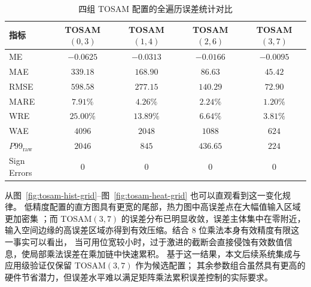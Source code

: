 \documentclass[12pt,a4paper,UTF8]{article}
\begin{document}
\begin{table}[htbp]
    \centering
    \caption{四组 TOSAM 配置的全遍历误差统计对比}
    \label{tab:tosam-error-compare}
    \small
    \setlength{\tabcolsep}{5pt}
    \begin{tabular}{lcccc}
        \toprule
        指标 & TOSAM$(0,3)$ & TOSAM$(1,4)$ & TOSAM$(2,6)$ & TOSAM$(3,7)$ \\
        \midrule
        ME & $-0.0625$ & $-0.0313$ & $-0.0166$ & $-0.0095$ \\
        MAE & $339.18$ & $168.90$ & $86.63$ & $45.42$ \\
        RMSE & $598.58$ & $277.15$ & $140.29$ & $72.90$ \\
        MARE & $7.91\%$ & $4.26\%$ & $2.24\%$ & $1.20\%$ \\
        WRE & $25.00\%$ & $13.89\%$ & $6.64\%$ & $3.81\%$ \\
        WAE & $4096$ & $2048$ & $1088$ & $624$ \\
        $P99_{\mathrm{raw}}$ & $2046$ & $845$ & $436.65$ & $224$ \\
        Sign Errors & $0$ & $0$ & $0$ & $0$ \\
        \bottomrule
    \end{tabular}
\end{table}

从图~\ref{fig:tosam-hist-grid}--图~\ref{fig:tosam-heat-grid} 也可以直观看到这一变化规律。
低精度配置的直方图具有更宽的尾部，热力图中高误差点在大幅值输入区域更加密集
；而 TOSAM$(3,7)$ 的误差分布已明显收敛，误差主体集中在零附近，
输入空间边缘的高误差区域亦得到有效压缩。结合 8 位乘法本身有效精度有限这一事实可以看出，
当可用位宽较小时，过于激进的截断会直接侵蚀有效数值信息，使局部乘法误差在乘加链中快速累积。
基于这一结果，本文后续系统集成与应用级验证仅保留 TOSAM$(3,7)$ 作为候选配置；
其余参数组合虽然具有更高的硬件节省潜力，但误差水平难以满足矩阵乘法累积误差控制的实际要求。
\end{document}
